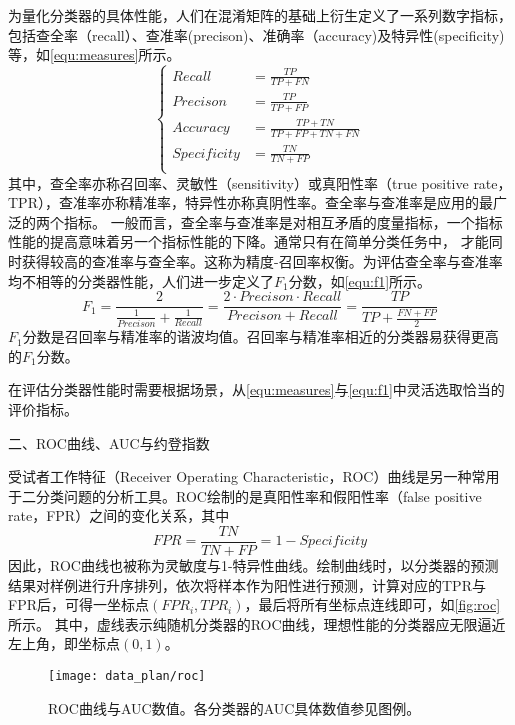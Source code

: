 为量化分类器的具体性能，人们在混淆矩阵的基础上衍生定义了一系列数字指标，包括查全率（recall）、查准率(precison)、准确率（accuracy)及特异性(specificity)等，如\autoref{equ:measures}所示。
\begin{equation}
      \label{equ:measures}
      \left \{
      \begin{aligned}
            Recall      &=\frac{TP}{TP+FN}         \\
            Precison    &=\frac{TP}{TP+FP}          \\
            Accuracy    &=\frac{TP+TN}{TP+FP+TN+FN} \\
            Specificity &=\frac{TN}{TN+FP}       \\
      \end{aligned}
      \right.
\end{equation}
其中，查全率亦称召回率、灵敏性（sensitivity）或真阳性率（true positive rate，TPR），查准率亦称精准率，特异性亦称真阴性率。查全率与查准率是应用的最广泛的两个指标\cite{Zhou2016,Aurélien2018}。
一般而言，查全率与查准率是对相互矛盾的度量指标，一个指标性能的提高意味着另一个指标性能的下降。通常只有在简单分类任务中，
才能同时获得较高的查准率与查全率。这称为精度-召回率权衡。为评估查全率与查准率均不相等的分类器性能，人们进一步定义了$F_1\text{分数}$，如\autoref{equ:f1}所示。
\begin{equation}
      \label{equ:f1}
      F_1=\frac{2}{\frac{1}{Precison}+\frac{1}{Recall}}=\frac{2\cdot Precison\cdot Recall}{Precison+Recall}=\frac{TP}{TP+\frac{FN+FP}{2}}
\end{equation}
$F_1\text{分数}$是召回率与精准率的谐波均值。召回率与精准率相近的分类器易获得更高的$F_1\text{分数}$。

在评估分类器性能时需要根据场景，从\autoref{equ:measures}与\autoref{equ:f1}中灵活选取恰当的评价指标。

二、ROC曲线、AUC与约登指数

受试者工作特征（Receiver Operating Characteristic，ROC）曲线是另一种常用于二分类问题的分析工具。ROC绘制的是真阳性率和假阳性率（false positive rate，FPR）之间的变化关系，其中
\begin{equation}
      \label{equ:fpr}
      FPR=\frac{TN}{TN+FP}=1-Specificity
\end{equation}
因此，ROC曲线也被称为灵敏度与1-特异性曲线。绘制曲线时，以分类器的预测结果对样例进行升序排列，依次将样本作为阳性进行预测，计算对应的TPR与FPR后，可得一坐标点$({FPR}_i,{TPR}_i)$，最后将所有坐标点连线即可，如\autoref{fig:roc}所示。
其中，虚线表示纯随机分类器的ROC曲线，理想性能的分类器应无限逼近左上角，即坐标点$(0,1)$。
\begin{figure}[htbp]
      \centering
      \texttt{[image: data\_plan/roc]}
      \caption[ROC曲线与AUC数值]{\label{fig:roc}ROC曲线与AUC数值。各分类器的AUC具体数值参见图例。}
\end{figure}

